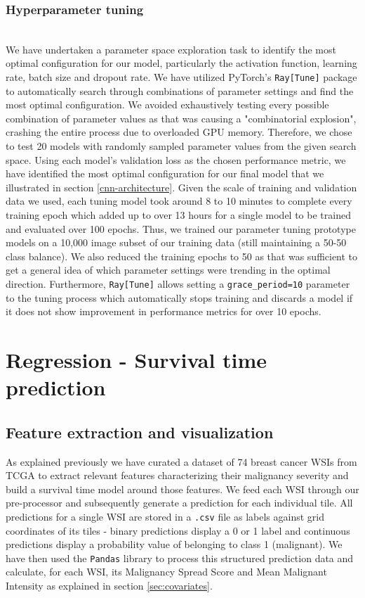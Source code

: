 \documentclass{l4proj}
\begin{document}
\subsubsection{Hyperparameter tuning}\hfill\\ \label{impl-hyperparam}
We have undertaken a parameter space exploration task to identify the most optimal configuration for our model, particularly the activation function, learning rate, batch size and dropout rate. We have utilized PyTorch's \texttt{Ray[Tune]} package to automatically search through combinations of parameter settings and find the most optimal configuration. We avoided exhaustively testing every possible combination of parameter values as that was causing a "combinatorial explosion", crashing the entire process due to overloaded GPU memory. Therefore, we chose to test 20 models with randomly sampled parameter values from the given search space. Using each model's validation loss as the chosen performance metric, we have identified the most optimal configuration  for our final model that we illustrated in section \ref{cnn-architecture}. Given the scale of training and validation data we used, each tuning model took around 8 to 10 minutes to complete every training epoch which added up to over 13 hours for a single model to be trained and evaluated over 100 epochs. Thus, we trained our parameter tuning prototype models on a 10,000 image subset of our training data (still maintaining a 50-50 class balance). We also reduced the training epochs to 50 as that was sufficient to get a general idea of which parameter settings were trending in the optimal direction. Furthermore, \texttt{Ray[Tune]} allows setting a \texttt{grace\_period=10} parameter to the tuning process which automatically stops training and discards a model if it does not show improvement in performance metrics for over 10 epochs.
 

\section{Regression - Survival time prediction}
\subsection{Feature extraction and visualization}
As explained previously we have curated a dataset of 74 breast cancer WSIs from TCGA to extract relevant features characterizing their malignancy severity and build a survival time model around those features. We feed each WSI through our pre-processor and subsequently generate a prediction for each individual tile. All predictions for a single WSI are stored in a \texttt{.csv} file as labels against  grid coordinates of its tiles - binary predictions display a 0 or 1 label and continuous predictions display a probability value of belonging to class 1 (malignant). We have then used the \texttt{Pandas} library to process this structured prediction data and calculate, for each WSI, its Malignancy Spread Score and Mean Malignant Intensity as explained in section \ref{sec:covariates}. 
\end{document}
